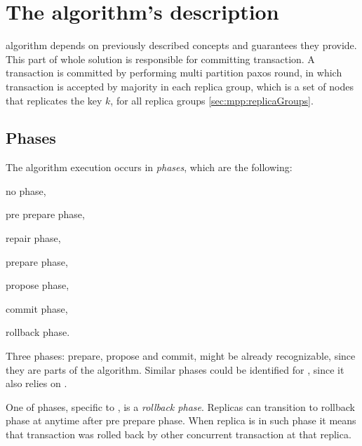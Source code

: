 
\section{The algorithm's description}
\mpp algorithm depends on previously described concepts and guarantees they provide. 
This part of whole solution is responsible for committing transaction. 
A transaction is committed by performing multi partition paxos round, 
in which transaction is accepted by majority in each replica group, 
which is a set of nodes that replicates the key $k$, for all replica groups \ref{sec:mpp:replicaGroups}. 

\subsection{Phases}
The algorithm execution occurs in \emph{phases}, which are the following: 
\begin{enumerate*}
\item no phase,
\item pre prepare phase,
\item repair phase,
\item prepare phase,
\item propose phase,
\item commit phase,
\item rollback phase.
\end{enumerate*}

Three phases: prepare, propose and commit, might be already recognizable, since they are parts of the \paxos algorithm. Similar phases could be identified for \lwt, since it also relies on \paxos.

One of phases, specific to \mpp, is a \emph{rollback phase}. Replicas can transition to rollback phase at anytime after pre prepare phase. When replica is in such phase it means that transaction was rolled back by other concurrent transaction at that replica. 




